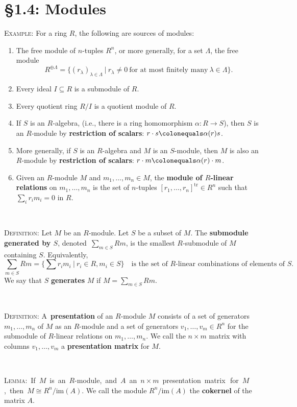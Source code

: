 \documentclass[12pt]{amsart}
\newcommand{\tr}{\mathrm{tr}}
\newcommand{\im}{\mathrm{im}}
\newcommand{\showsol}[1]{\def\displaysol{#1}}
\newcommand\ceq{\colonequals}
\begin{document}
\showsol{1}
	
	\thispagestyle{empty}
	
	\section*{\S1.4: Modules}	

\begin{framed}
\noindent \textsc{Example:} For a ring $R$, the following are sources of modules:
\begin{enumerate}
\item The free module of $n$-tuples $R^n$, or more generally, for a set $\Lambda$, the free module
\[ R^{\oplus \Lambda} = \{ (r_\lambda)_{\lambda\in\Lambda} \ | \ r_\lambda\neq 0 \ \text{for at most finitely many} \ \lambda\in\Lambda\}.\]
\item Every ideal $I\subseteq R$ is a submodule of $R$.
\item Every quotient ring $R/I$ is a quotient module of $R$.
\item If $S$ is an $R$-algebra, (i.e., there is a ring homomorphism $\alpha: R\to S$), then $S$ is an $R$-module by \textbf{restriction of scalars}:
$r \cdot s \ceq \alpha(r) s$.
\item More generally, if $S$ is an $R$-algebra and $M$ is an $S$-module, then $M$ is also an $R$-module by \textbf{restriction of scalars}: $r \cdot m \ceq \alpha(r) \cdot m$.
\item Given an $R$-module $M$ and $m_1,\dots,m_n\in M$, the \textbf{module of $R$-linear relations} on $m_1,\dots,m_n$ is the set of $n$-tuples $[r_1,\dots,r_n]^\tr \in R^n$ such that $\sum_i r_i m_i=0$ in $R$.
\end{enumerate}
 
 \
 
 \noindent \textsc{Definition:} Let $M$ be an $R$-module. Let $S$ be a subset of $M$. The \textbf{submodule generated by $S$}, denoted\footnotemark \, $\sum_{m\in S} Rm$, is the smallest $R$-submodule of $M$ containing $S$. Equivalently, 
\[ \sum_{m\in S} Rm = \big\{ \sum r_i m_i \ | \ r_i \in R, m_i \in S\big\} \quad \text{is the set of $R$-linear combinations of elements of $S$.}\]
We say that $S$ \textbf{generates} $M$ if $M=\sum_{m\in S} Rm$.

\

\noindent \textsc{Definition:} A\footnotemark\ \textbf{presentation} of an $R$-module $M$ consists of a set of generators $m_1,\dots,m_n$ of $M$ as an $R$-module and a set of generators $v_1,\dots, v_m\in R^n$ for the submodule of $R$-linear relations on $m_1,\dots,m_n$. We call the $n \times m$ matrix with columns $v_1,\dots, v_m$ a \textbf{presentation matrix} for $M$. 

\

\noindent \textsc{Lemma:}\mbox{ If $M$ is an $R$-module, and $A$ an $n\times m$ presentation matrix\footnotemark\, for $M$,~then~${M\cong R^n / \im(A)}$.} We call the module $R^n / \im(A)$ the \textbf{cokernel} of the matrix $A$.


 \end{framed}
\end{document}
